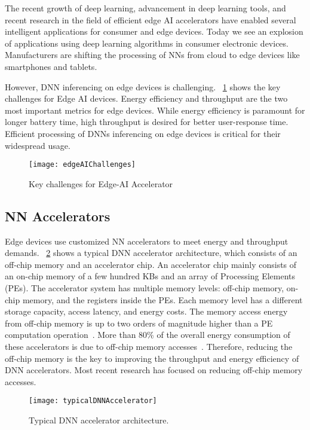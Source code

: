 The recent growth of deep learning, advancement in deep learning tools, and recent research in the field of efficient edge AI accelerators have enabled several intelligent applications for consumer and edge devices. Today we see an explosion of applications using deep learning algorithms in consumer electronic devices.
Manufacturers are shifting the processing of NNs from cloud to edge devices like smartphones and tablets. 

However, DNN inferencing on edge devices is challenging. \figurename{~\ref{fig:edgeAIChallenges}} shows the key challenges for Edge AI devices. Energy efficiency and throughput are the two most important metrics for edge devices. While energy efficiency is paramount for longer battery time, high throughput is desired for better user-response time. Efficient processing of DNNs inferencing on edge devices is critical for their widespread usage. 

\begin{figure}[!htb]
	\centering
	\captionsetup{font=sf}
	\texttt{[image: edgeAIChallenges]}
	\caption{Key challenges for Edge-AI Accelerator}
	\label{fig:edgeAIChallenges}
\end{figure}
\subsection{NN Accelerators}
Edge devices use customized NN accelerators to meet energy and throughput demands. \figurename{~\ref{fig:typicalDNNAccelerator}} shows a typical DNN accelerator architecture, which consists of an off-chip memory and an accelerator chip. An accelerator chip mainly consists of an on-chip memory of a few hundred KBs and an array of Processing Elements (PEs). The accelerator system has multiple memory levels: off-chip memory, on-chip memory, and the registers inside the PEs. Each memory level has a different storage capacity, access latency, and energy costs. The memory access energy from off-chip memory is up to two orders of magnitude higher than a PE computation operation~\cite{Chen2016EyerissAS}. More than 80\% of the overall energy consumption of these accelerators is due to off-chip memory accesses~\cite{chen2014diannao}. Therefore, reducing the off-chip memory is the key to improving the throughput and energy efficiency of DNN accelerators. Most recent research has focused on reducing off-chip memory accesses.
\begin{figure}[!htb]
	\centering
	\captionsetup{font=sf}
	\texttt{[image: typicalDNNAccelerator]}
    \caption{Typical DNN accelerator architecture.}
   	\label{fig:typicalDNNAccelerator}
    \vspace{1.0em}
\end{figure}


